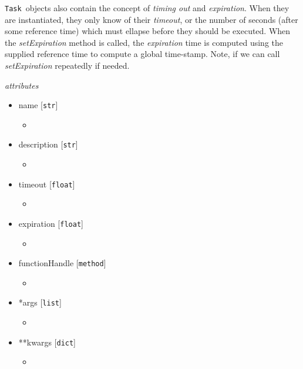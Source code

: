 \documentclass{article}
\newcommand{\Task}{\texttt{Task}~}
\begin{document}
\Task objects also contain the concept of \textit{timing out} and \textit{expiration}.
When they are instantiated, they only know of their \textit{timeout}, or the number of seconds (after some reference time) which must ellapse before they should be executed.
When the \textit{setExpiration} method is called, the \textit{expiration} time is computed using the supplied reference time to compute a global time-stamp.
Note, if we can call \textit{setExpiration} repeatedly if needed.

\vspace{0.5cm}
\noindent
\textit{attributes}

\begin{itemize}
    \item{name [\texttt{str}]
        \begin{itemize}
            \item{}
        \end{itemize}
         }
    \item{description [\texttt{str}]
        \begin{itemize}
            \item{}
        \end{itemize}
         }
    \item{timeout [\texttt{float}]
        \begin{itemize}
            \item{}
        \end{itemize}
         }
    \item{expiration [\texttt{float}]
        \begin{itemize}
            \item{}
        \end{itemize}
         }
    \item{functionHandle [\texttt{method}]
        \begin{itemize}
            \item{}
        \end{itemize}
         }
    \item{*args [\texttt{list}]
        \begin{itemize}
            \item{}
        \end{itemize}
         }
    \item{**kwargs [\texttt{dict}]
        \begin{itemize}
            \item{}
        \end{itemize}
         }
\end{itemize}
\end{document}
